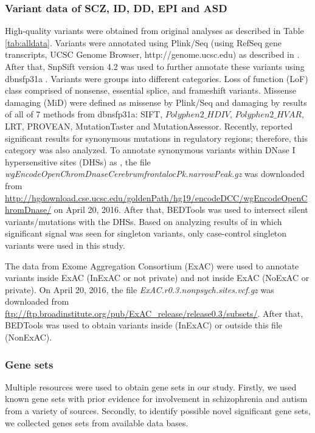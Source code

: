 \documentclass[]{article}
\begin{document}
\subsubsection{Variant data of SCZ, ID, DD, EPI and ASD}


High-quality variants were obtained from original analyses as
described in Table \ref{tab:alldata}.
Variants were annotated using Plink/Seq (using RefSeq gene
transcripts, UCSC Genome Browser,  http://genome.ucsc.edu) as described in
\cite{fromer2014novo}.
After that, SnpSift version 4.2 \citep{cingolani2012program} was used
to further annotate these variants using dbnsfp31a
\citep{liu2015dbnsfp}. Variants were groups into different
categories. Loss of function (LoF) class comprised of nonsense,
essential splice, and frameshift variants. Missense damaging (MiD) were defined as
missense by Plink/Seq and damaging by results of all of 7 methods \cite{genovese2016increased} from
dbnsfp31a: SIFT, $Polyphen2\_HDIV$, $Polyphen2\_HVAR$, LRT, PROVEAN,
MutationTaster and MutationAssessor. Recently, \citet{takata2016novo} reported significant results for synonymous mutations in regulatory regions; therefore, this category was also analyzed. To annotate synonymous variants within DNase I hypersensitive sites (DHSs) as \citet{takata2016novo}, the file
\emph{wgEncodeOpenChromDnaseCerebrumfrontalocPk.narrowPeak.gz} was
downloaded from \url{http://hgdownload.cse.ucsc.edu/goldenPath/hg19/encodeDCC/wgEncodeOpenChromDnase/}
on April 20, 2016. After that, BEDTools \citep{quinlan2010bedtools} was used to intersect silent
variants/mutations with the DHSs. Based on analyzing results of
\cite{genovese2016increased} in which significant signal was seen for
singleton variants, only case-control singleton variants were used in this study.

The data from Exome Aggregation Consortium (ExAC) \citep{lek2015analysis} were used
to annotate variants inside ExAC (InExAC or not private) and not inside
ExAC (NoExAC or private). On April 20, 2016, the file \emph{ExAC.r0.3.nonpsych.sites.vcf.gz} was downloaded from
\url{ftp://ftp.broadinstitute.org/pub/ExAC_release/release0.3/subsets/}. After
that, BEDTools was used to obtain variants inside (InExAC) or outside this file (NonExAC).

\subsubsection{Gene sets}


Multiple resources were used to obtain gene sets in our study.
Firstly, we used known gene sets with prior evidence for involvement in
schizophrenia and autism from a variety of sources. Secondly, to
identify possible novel significant gene sets, we collected  genes
sets from available data bases.
\end{document}

